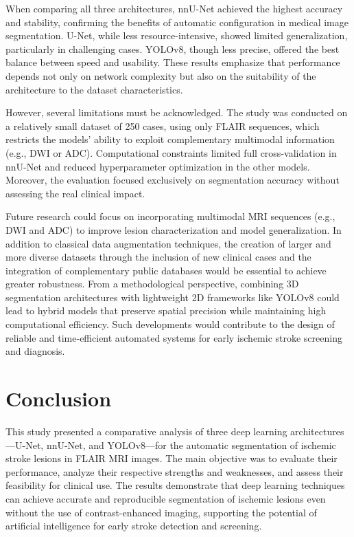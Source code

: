 \documentclass[12pt]{article}
\begin{document}
When comparing all three architectures, nnU-Net achieved the highest accuracy and stability, confirming the benefits of automatic configuration in medical image segmentation. U-Net, while less resource-intensive, showed limited generalization, particularly in challenging cases. YOLOv8, though less precise, offered the best balance between speed and usability. These results emphasize that performance depends not only on network complexity but also on the suitability of the architecture to the dataset characteristics. 

However, several limitations must be acknowledged. The study was conducted on a relatively small dataset of 250 cases, using only FLAIR sequences, which restricts the models’ ability to exploit complementary multimodal information (e.g., DWI or ADC). Computational constraints limited full cross-validation in nnU-Net and reduced hyperparameter optimization in the other models. Moreover, the evaluation focused exclusively on segmentation accuracy without assessing the real clinical impact.

Future research could focus on incorporating multimodal MRI sequences (e.g., DWI and ADC) to improve lesion characterization and model generalization. In addition to classical data augmentation techniques, the creation of larger and more diverse datasets through the inclusion of new clinical cases and the integration of complementary public databases would be essential to achieve greater robustness. From a methodological perspective, combining 3D segmentation architectures with lightweight 2D frameworks like YOLOv8 could lead to hybrid models that preserve spatial precision while maintaining high computational efficiency. Such developments would contribute to the design of reliable and time-efficient automated systems for early ischemic stroke screening and diagnosis.

\section{Conclusion} \label{sec:conclusion}


This study presented a comparative analysis of three deep learning architectures—U-Net, nnU-Net, and YOLOv8—for the automatic segmentation of ischemic stroke lesions in FLAIR MRI images. The main objective was to evaluate their performance, analyze their respective strengths and weaknesses, and assess their feasibility for clinical use. The results demonstrate that deep learning techniques can achieve accurate and reproducible segmentation of ischemic lesions even without the use of contrast-enhanced imaging, supporting the potential of artificial intelligence for early stroke detection and screening.
\end{document}
